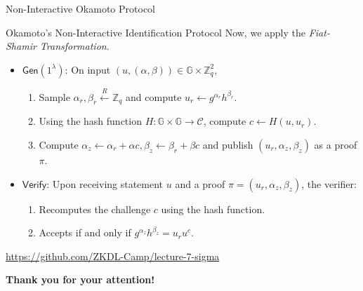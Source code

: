 \documentclass[xcolor={usenames,dvipsnames}]{beamer}
\begin{document}
    \begin{frame}{Non-Interactive Okamoto Protocol}
        \begin{block}{Okamoto's Non-Interactive Identification Protocol}
            Now, we apply the \textit{Fiat-Shamir Transformation}.
            \begin{itemize}
                \item $\mathsf{Gen}(1^{\lambda})$: On input $(u,(\alpha,\beta)) \in \mathbb{G} \times \mathbb{Z}_q^2$, 
                \begin{enumerate}
                    \item Sample $\alpha_r,\beta_r \xleftarrow{R} \mathbb{Z}_q$ and compute $u_r \gets g^{\alpha_r}h^{\beta_r}$.
                    \item Using the hash function $H: \mathbb{G} \times \mathbb{G} \to \mathcal{C}$, compute $c \gets H(u,u_r)$.
                    \item Compute $\alpha_z \gets \alpha_r + \alpha c, \beta_z \gets \beta_r + \beta c$ and publish $(u_r,\alpha_z,\beta_z)$ as a proof $\pi$.
                \end{enumerate}
                \item $\mathsf{Verify}$: Upon receiving statement $u$ and a proof $\pi=(u_r,\alpha_z,\beta_z)$, the verifier:
                \begin{enumerate}
                    \item Recomputes the challenge $c$ using the hash function.
                    \item Accepts if and only if $g^{\alpha_z}h^{\beta_z} = u_ru^c$.
                \end{enumerate}
            \end{itemize}
        \end{block}

        \begin{center}
            \textcolor{red!80!black}{\url{https://github.com/ZKDL-Camp/lecture-7-sigma}}
        \end{center}
    \end{frame}

	\begin{frame}{}
      \centering \Large
      \textbf{Thank you for your attention!}
    \end{frame}
\end{document}
